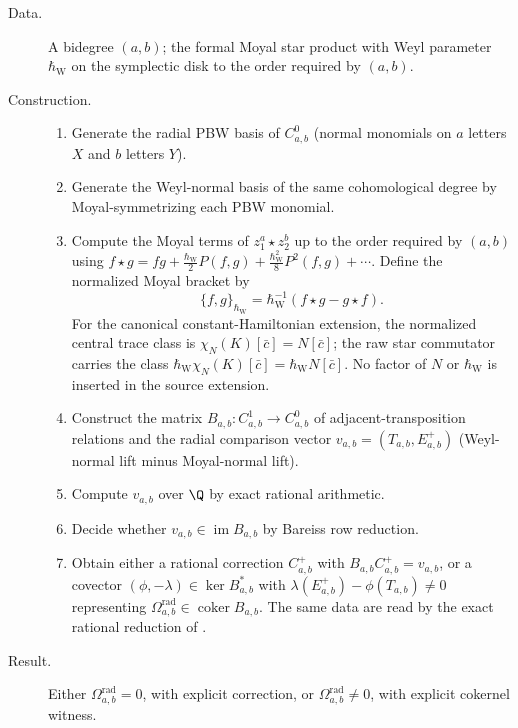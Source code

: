 \begin{description}
\item[Data.]  A bidegree \((a,b)\); the formal Moyal star product with
Weyl parameter \(\hbar_{\mathrm{W}}\) on the symplectic disk to the
order required by \((a,b)\).
\item[Construction.]
\begin{enumerate}
\item Generate the radial PBW basis of \(C^0_{a,b}\) (normal monomials
on \(a\) letters \(X\) and \(b\) letters \(Y\)).
\item Generate the Weyl-normal basis of the same cohomological degree
by Moyal-symmetrizing each PBW monomial.
\item Compute the Moyal terms of \(z_1^a\star z_2^b\) up to the order
required by \((a,b)\) using
\(f\star g=fg+\tfrac{\hbar_{\mathrm{W}}}{2}P(f,g)
+\tfrac{\hbar_{\mathrm{W}}^2}{8}P^2(f,g)+\cdots\).
Define the normalized Moyal bracket by
\[
  \{f,g\}_{\hbar_{\mathrm W}}
  =\hbar_{\mathrm W}^{-1}(f\star g-g\star f).
\]
For the canonical constant-Hamiltonian extension, the normalized
central trace class is \(\chi_N(K)[\bar c]=N[\bar c]\); the raw
star commutator carries the class
\(\hbar_{\mathrm W}\chi_N(K)[\bar c]
=\hbar_{\mathrm W}N[\bar c]\).  No factor of \(N\) or
\(\hbar_{\mathrm W}\) is inserted in the source extension.
\item Construct the matrix \(B_{a,b}\colon C^1_{a,b}\to C^0_{a,b}\)
of adjacent-transposition relations and the radial comparison vector
\(v_{a,b}=(T_{a,b},E^+_{a,b})\) (Weyl-normal lift minus Moyal-normal
lift).
\item Compute \(v_{a,b}\) over \(\Q\) by exact rational arithmetic.
\item Decide whether \(v_{a,b}\in\operatorname{im}B_{a,b}\) by
Bareiss row reduction.
\item Obtain either a rational correction \(C^+_{a,b}\) with
\(B_{a,b}C^+_{a,b}=v_{a,b}\), or a covector
\((\phi,-\lambda)\in\ker B_{a,b}^*\) with
\(\lambda(E^+_{a,b})-\phi(T_{a,b})\ne 0\) representing
\(\Omega^{\mathrm{rad}}_{a,b}\in\operatorname{coker}B_{a,b}\).
The same data are read by the exact rational reduction of
.
\end{enumerate}
\item[Result.]  Either
\(\Omega^{\mathrm{rad}}_{a,b}=0\), with explicit correction, or
\(\Omega^{\mathrm{rad}}_{a,b}\ne 0\), with explicit cokernel witness.
\end{description}

